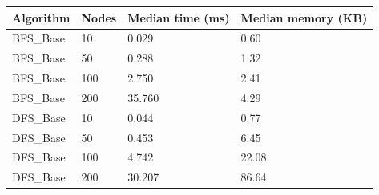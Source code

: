 \begin{tabular}{llll}
\toprule
Algorithm & Nodes & Median time (ms) & Median memory (KB) \\
\midrule
BFS\_Base & 10 & 0.029 & 0.60 \\
BFS\_Base & 50 & 0.288 & 1.32 \\
BFS\_Base & 100 & 2.750 & 2.41 \\
BFS\_Base & 200 & 35.760 & 4.29 \\
DFS\_Base & 10 & 0.044 & 0.77 \\
DFS\_Base & 50 & 0.453 & 6.45 \\
DFS\_Base & 100 & 4.742 & 22.08 \\
DFS\_Base & 200 & 30.207 & 86.64 \\
\bottomrule
\end{tabular}
